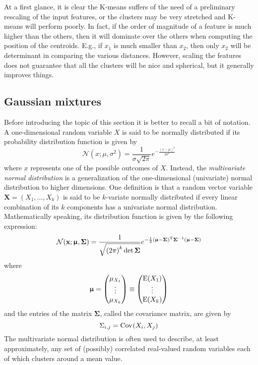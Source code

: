 At a first glance, it is clear the K-means suffers of the need of a preliminary rescaling of the input features, or the clusters may be very stretched and K-means will perform poorly. In fact, if the order of magnitude of a feature is much higher than the others, then it will dominate over the others when computing the position of the centroids. E.g., if $x_1$ is much smaller than $x_2$, then only $x_2$ will be determinant in comparing the various distances. However, scaling the features does not guarantee that all the clusters will be nice and spherical, but it generally improves things.
\subsection{Gaussian mixtures}
Before introducing the topic of this section it is better to recall a bit of notation. A one-dimensional random variable $X$ is said to be normally distributed if its probability distribution function is given by
\begin{equation}
\mathcal{N}(x;\mu,\sigma^2)=\frac{1}{\sigma\sqrt{2\pi}}e^{-\frac{{(x-\mu)}^2}{2\sigma^2}}
\end{equation}
where $x$ represents one of the possible outcomes of $X$. Instead, the \emph{multivariate normal distribution} is a generalization of the one-dimensional (univariate) normal distribution to higher dimensions. One definition is that a random vector variable $\mathbf{X}=(X_1,\ldots,X_k)$ is said to be $k$-variate normally distributed if every linear combination of its $k$ components has a univariate normal distribution. Mathematically speaking, its distribution function is given by the following expression:
\begin{equation}
\mathcal{N}(\mathbf{x};\boldsymbol{\upmu},\boldsymbol{\Sigma})=\frac{1}{\sqrt{{(2\pi)}^k\det{\boldsymbol{\Sigma}}}}e^{-\frac{1}{2}{(\boldsymbol{\upmu}-\boldsymbol{\Sigma})}^{\mathrm{T}}\boldsymbol{\Sigma}^{-1}(\boldsymbol{\upmu}-\boldsymbol{\Sigma})}
\end{equation}
where
\begin{equation}
\boldsymbol{\upmu}=\begin{pmatrix}
\mu_{X_1} \\
\vdots \\
\mu_{X_k} \\
\end{pmatrix}\equiv\begin{pmatrix}
\operatorname{E}(X_1) \\
\vdots \\
\operatorname{E}(X_k) \\
\end{pmatrix}
\end{equation}
and the entries of the matrix $\boldsymbol{\Sigma}$, called the covariance matrix, are given by
\begin{equation}
\Sigma_{i,j}=\operatorname{Cov}\mspace{1mu}(X_i,X_j)
\end{equation}
The multivariate normal distribution is often used to describe, at least approximately, any set of (possibly) correlated real-valued random variables each of which clusters around a mean value.

